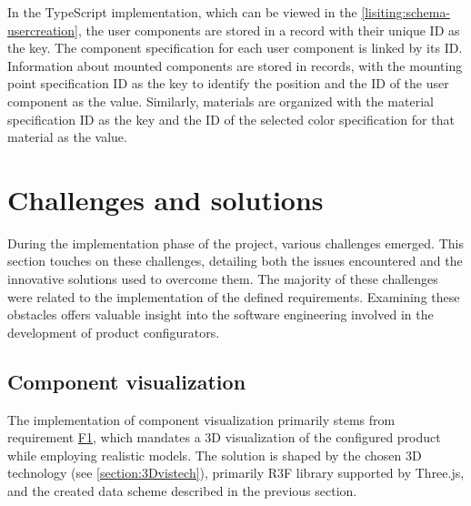 In the TypeScript implementation, which can be viewed in the \autoref{lisiting:schema-usercreation}, the user components are stored in a record with their unique ID as the key. The component specification for each user component is linked by its ID. Information about mounted components are stored in records, with the mounting point specification ID as the key to identify the position and the ID of the user component as the value. Similarly, materials are organized with the material specification ID as the key and the ID of the selected color specification for that material as the value.


\section{Challenges and solutions}

During the implementation phase of the project, various challenges emerged. This section touches on these challenges, detailing both the issues encountered and the innovative solutions used to overcome them. The majority of these challenges were related to the implementation of the defined requirements. Examining these obstacles offers valuable insight into the software engineering involved in the development of product configurators.


\subsection{Component visualization}

The implementation of component visualization primarily stems from requirement \hyperref[itm:F1]{F1}, which mandates a 3D visualization of the configured product while employing realistic models. The solution is shaped by the chosen 3D technology (see \autoref{section:3Dvistech}), primarily R3F library supported by Three.js, and the created data scheme described in the previous section.

